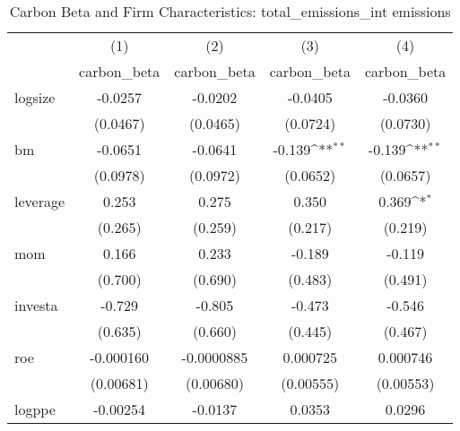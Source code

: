 \begin{table}[htbp]\centering
\def\sym#1{\ifmmode^{#1}\else\(^{#1}\)\fi}
\caption{Carbon Beta and Firm Characteristics: total\_emissions\_int emissions}
\begin{tabular}{l*{4}{c}}
\hline\hline
                    &\multicolumn{1}{c}{(1)}&\multicolumn{1}{c}{(2)}&\multicolumn{1}{c}{(3)}&\multicolumn{1}{c}{(4)}\\
                    &\multicolumn{1}{c}{carbon\_beta}&\multicolumn{1}{c}{carbon\_beta}&\multicolumn{1}{c}{carbon\_beta}&\multicolumn{1}{c}{carbon\_beta}\\
\hline
logsize             &     -0.0257         &     -0.0202         &     -0.0405         &     -0.0360         \\
                    &    (0.0467)         &    (0.0465)         &    (0.0724)         &    (0.0730)         \\
[1em]
bm                  &     -0.0651         &     -0.0641         &      -0.139\sym{**} &      -0.139\sym{**} \\
                    &    (0.0978)         &    (0.0972)         &    (0.0652)         &    (0.0657)         \\
[1em]
leverage            &       0.253         &       0.275         &       0.350         &       0.369\sym{*}  \\
                    &     (0.265)         &     (0.259)         &     (0.217)         &     (0.219)         \\
[1em]
mom                 &       0.166         &       0.233         &      -0.189         &      -0.119         \\
                    &     (0.700)         &     (0.690)         &     (0.483)         &     (0.491)         \\
[1em]
investa             &      -0.729         &      -0.805         &      -0.473         &      -0.546         \\
                    &     (0.635)         &     (0.660)         &     (0.445)         &     (0.467)         \\
[1em]
roe                 &   -0.000160         &  -0.0000885         &    0.000725         &    0.000746         \\
                    &   (0.00681)         &   (0.00680)         &   (0.00555)         &   (0.00553)         \\
[1em]
logppe              &    -0.00254         &     -0.0137         &      0.0353         &      0.0296         \\

\end{tabular}
\end{table}
